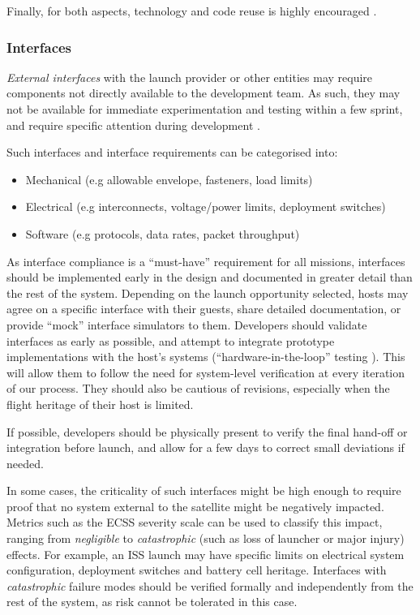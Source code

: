 \documentclass[journal,10pt]{IEEEtran}
\begin{document}
Finally, for both aspects, technology and code reuse is highly encouraged \autocite{heinHeritageTechnologiesSpace2016}.

\subsubsection{Interfaces}
\label{sec:methodology_interfaces}

\emph{External interfaces} with the launch provider or other entities may require components not directly available to the development team.
As such, they may not be available for immediate experimentation and testing within a few sprint, and require specific attention during development 
	\autocite[95]{honore-livermoreIntegratingAgileSystems2022}.

Such interfaces and interface requirements can be categorised into:
\begin{itemize}
	\item Mechanical (e.g allowable envelope, fasteners, load limits)
	\item Electrical (e.g interconnects, voltage/power limits, dep\-lo\-yment swit\-ches)
	\item Software (e.g protocols, data rates, packet throughput)
\end{itemize}


As interface compliance is a ``must-have'' requirement for all missions, interfaces should be implemented early in the design and documented in greater detail than the rest of the system.
Depending on the launch opportunity selected, hosts may agree on a specific interface with their guests, share detailed documentation, or provide ``mock'' interface simulators to them.
Developers should validate interfaces as early as possible, and attempt to integrate prototype implementations with the host's systems (``hardware-in-the-loop'' testing \autocite{honore-livermoreDigitalEngineeringDevelopment2022}). This will allow them to follow the need for system-level verification at every iteration of our process.
They should also be cautious of revisions, especially when the flight heritage of their host is limited.

If possible, developers should be physically present to verify the final hand-off or integration before launch, and allow for a few days to correct small deviations if needed.
	
In some cases, the criticality of such interfaces might be high enough to require proof that no system external to the satellite might be negatively impacted.
Metrics such as the ECSS severity scale \autocite{ECSS-Q-ST-30-02C} can be used to classify this impact, ranging from \emph{negligible} to \emph{catastrophic} (such as loss of launcher or major injury) effects.
For example, an {\ac{ISS}} launch may have specific limits on electrical system configuration, deployment switches and battery cell heritage.
Interfaces with \emph{catastrophic} failure modes should be verified formally and independently from the rest of the system, as risk cannot be tolerated in this case.%
\end{document}
